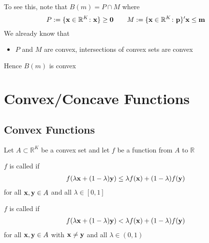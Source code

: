 \documentclass[letterpaper,10pt,english]{jupyterBook}
\begin{document}
\sphinxAtStartPar
To see this, note that \(B(m) = P \cap M\) where
\begin{equation*}
\begin{split}
%
P := \{ {\bf x} \in \mathbb{R}^K \colon {\bf x \} \geq {\bf 0} }
\qquad
M := \{ {\bf x} \in \mathbb{R}^K \colon {\bf p \}' {\bf x} \leq m}
%
\end{split}
\end{equation*}
\sphinxAtStartPar
We already know that
\begin{itemize}
\item {} 
\sphinxAtStartPar
\(P\) and \(M\) are convex, intersections of convex sets are convex

\end{itemize}

\sphinxAtStartPar
Hence \(B(m)\) is convex


\section{Convex/Concave Functions}
\label{\detokenize{06.optimization_fundamentals:convex-concave-functions}}

\subsection{Convex Functions}
\label{\detokenize{06.optimization_fundamentals:convex-functions}}
\sphinxAtStartPar
Let \(A \subset \mathbb{R}^K\) be a convex set and let \(f\) be a function from \(A\) to \(\mathbb{R}\)

\sphinxAtStartPar
\(f\) is called  if
\begin{equation*}
\begin{split}
%
f(\lambda {\bf x} + (1 - \lambda) {\bf y})
\leq \lambda f({\bf x}) + (1 - \lambda) f({\bf y})
%
\end{split}
\end{equation*}
\sphinxAtStartPar
for all \({\bf x}, {\bf y} \in A\) and all \(\lambda \in [0, 1]\)

\sphinxAtStartPar
\(f\) is called  if
\begin{equation*}
\begin{split}
%
f(\lambda {\bf x} + (1 - \lambda) {\bf y})
< \lambda f({\bf x}) + (1 - \lambda) f({\bf y})
%
\end{split}
\end{equation*}
\sphinxAtStartPar
for all \({\bf x}, {\bf y} \in A\) with \({\bf x} \ne {\bf y}\) and all \(\lambda \in (0, 1)\)
\end{document}
